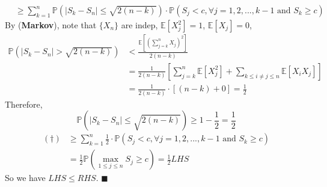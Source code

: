 \documentclass[a4paper,12pt,twoside]{book}
\begin{document}
\begin{itemize}
\begin{equation}
\begin{split}
			&\geq \sum_{k=1}^n \mathbb{P}\left(|S_k-S_n| \leq \sqrt{2(n-k)}\right)\cdot \mathbb{P}\left(S_j < c, \forall j=1,2,...,k-1 \text{ and } S_k \geq c\right)
		\end{split}
	\end{equation}
	By (\textbf{Markov}), note that $\{X_n\}$ are indep, $\mathbb{E}\left[X_j^2\right]=1$, $\mathbb{E}\left[X_j\right]=0$,
	\begin{equation}
		\begin{split}
			\mathbb{P}\left(|S_k-S_n| > \sqrt{2(n-k)}\right)&<\frac{\mathbb{E}\left[(\sum_{j=k}^n X_j)^2\right]}{2(n-k)}\\
			&=\frac{1}{2(n-k)}\left[\sum_{j=k}^n \mathbb{E}\left[X_j^2\right]+\sum_{k\leq i\ne j\leq n} \mathbb{E}\left[X_iX_j\right]\right]\\
			&=\frac{1}{2(n-k)}\cdot[(n-k)+0]=\frac{1}{2}
		\end{split}
	\end{equation}
	Therefore,
	\begin{equation}
		\mathbb{P}\left(|S_k-S_n| \leq \sqrt{2(n-k)}\right)\geq 1-\frac{1}{2}=\frac{1}{2}
	\end{equation}
	\begin{equation}
		\begin{split}
			(\dagger)&\geq \sum_{k=1}^n \frac{1}{2}\cdot \mathbb{P}\left(S_j < c, \forall j=1,2,...,k-1 \text{ and } S_k \geq c\right)\\
			&=\frac{1}{2}\mathbb{P}\left(\max\limits_{1\leq j\leq n}S_j \geq c\right)=\frac{1}{2}LHS
		\end{split}
	\end{equation}
	So we have $LHS\leq RHS$. $\blacksquare$
\end{itemize}
\end{document}
